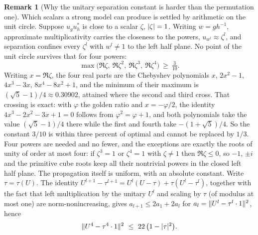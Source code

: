 \documentclass[11pt]{amsart}
\theoremstyle{definition}
\newtheorem{remark}[theorem]{Remark}
\theoremstyle{plain}
\DeclarePairedDelimiter{\abs}{\lvert}{\rvert}
\DeclarePairedDelimiter{\norm}{\lVert}{\rVert}
\begin{document}
\begin{remark}[Why the unitary separation constant is harder than the permutation one]
Which scalars a strong model can produce is settled by arithmetic on the unit circle.  Suppose \(u_gu_h^*\) is close to a scalar \(\zeta\), \(\abs\zeta=1\).  Writing \(w=gh^{-1}\), approximate multiplicativity carries the closeness to the powers, \(u_{w^l}\approx\zeta^l\), and separation confines every \(\zeta^l\) with \(w^l\neq1\) to the left half plane.  No point of the unit circle survives that for four powers:
\[
 \max\bigl(\Re\zeta,\ \Re\zeta^2,\ \Re\zeta^3,\ \Re\zeta^4\bigr)\ \geq\ \tfrac3{10}.
\]
Writing \(x=\Re\zeta\), the four real parts are the Chebyshev polynomials \(x\), \(2x^2-1\), \(4x^3-3x\), \(8x^4-8x^2+1\), and the minimum of their maximum is \((\sqrt5-1)/4\approx0.30902\), attained where the second and third cross.  That crossing is exact: with \(\varphi\) the golden ratio and \(x=-\varphi/2\), the identity \(4x^3-2x^2-3x+1=0\) follows from \(\varphi^2=\varphi+1\), and both polynomials take the value \((\sqrt5-1)/4\) there while the first and fourth take \(-(1+\sqrt5)/4\).  So the constant \(3/10\) is within three percent of optimal and cannot be replaced by \(1/3\).  Four powers are needed and no fewer, and the exceptions are exactly the roots of unity of order at most four: if \(\zeta^3=1\) or \(\zeta^4=1\) with \(\zeta\neq1\) then \(\Re\zeta\leq0\), so \(-1\), \(\pm i\) and the primitive cube roots keep all their nontrivial powers in the closed left half plane.  The propagation itself is uniform, with an absolute constant.  Write \(\tau=\tau(U)\).  The identity \(U^{l+1}-\tau^{l+1}=U^l(U-\tau)+\tau(U^l-\tau^l)\), together with the fact that left multiplication by the unitary \(U^l\) and scaling by \(\tau\) (of modulus at most one) are norm-nonincreasing, gives \(a_{l+1}\leq2a_1+2a_l\) for \(a_l=\norm{U^l-\tau^l\cdot1}^2\), hence
\[
 \norm{U^4-\tau^4\cdot1}^2\ \leq\ 22\,\bigl(1-\abs{\tau}^2\bigr).
\]

\end{remark}
\end{document}
